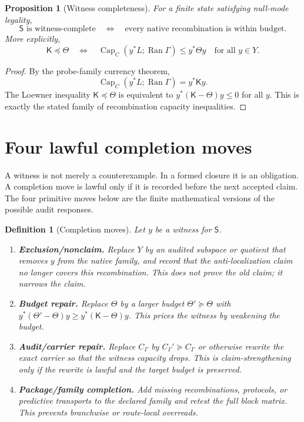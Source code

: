 \documentclass[11pt]{article}
\newtheorem{proposition}[theorem]{Proposition}
\newtheorem{definition}[theorem]{Definition}
\newcommand{\K}{\mathsf K}
\newcommand{\Sstate}{\mathsf S}
\newcommand{\Ran}{\operatorname{Ran}}
\newcommand{\pre}{\preceq}
\newcommand{\suc}{\succeq}
\begin{document}
\begin{proposition}[Witness completeness]
For a finite state satisfying null-mode legality,
\[
\Sstate\text{ is witness-complete}
\quad\Longleftrightarrow\quad
\text{every native recombination is within budget.}
\]
More explicitly,
\[
\K\pre\Theta
\quad\Longleftrightarrow\quad
\operatorname{Cap}_C(y^*L;\Ran\Gamma)\le y^*\Theta y
\quad\text{for all }y\in Y.
\]
\end{proposition}

\begin{proof}
By the probe-family currency theorem,
\[
\operatorname{Cap}_C(y^*L;\Ran\Gamma)=y^*\K y.
\]
The Loewner inequality $\K\pre\Theta$ is equivalent to $y^*(\K-\Theta)y\le0$ for all $y$.  This is exactly the stated family of recombination capacity inequalities.
\end{proof}

\section{Four lawful completion moves}

A witness is not merely a counterexample.  In a formed closure it is an obligation.  A completion move is lawful only if it is recorded before the next accepted claim.  The four primitive moves below are the finite mathematical versions of the possible audit responses.

\begin{definition}[Completion moves]
Let $y$ be a witness for $\Sstate$.
\begin{enumerate}[label=\textbf{M\arabic*.}]
\item \textbf{Exclusion/nonclaim.}  Replace $Y$ by an audited subspace or quotient that removes $y$ from the native family, and record that the anti-localization claim no longer covers this recombination.  This does not prove the old claim; it narrows the claim.
\item \textbf{Budget repair.}  Replace $\Theta$ by a larger budget $\Theta'\suc\Theta$ with $y^*(\Theta'-\Theta)y\ge y^*(\K-\Theta)y$.  This prices the witness by weakening the budget.
\item \textbf{Audit/carrier repair.}  Replace $C_\Gamma$ by $C_\Gamma'\suc C_\Gamma$ or otherwise rewrite the exact carrier so that the witness capacity drops.  This is claim-strengthening only if the rewrite is lawful and the target budget is preserved.
\item \textbf{Package/family completion.}  Add missing recombinations, protocols, or predictive transports to the declared family and retest the full block matrix.  This prevents branchwise or route-local overreads.
\end{enumerate}
\end{definition}
\end{document}
